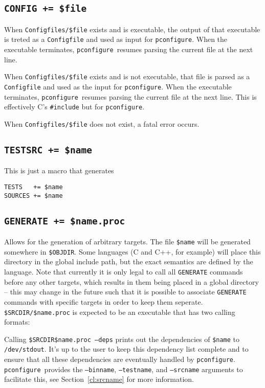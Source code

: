 \documentclass{article}
\newcommand{\pconfigure}{\texttt{pconfigure}}
\begin{document}
\subsection{\texttt{CONFIG += \$file} \label{cmd:config}}

When \texttt{Configfiles/\$file} exists and is executable, the output
of that executable is treted as a \texttt{Configfile} and used as
input for \pconfigure.  When the executable terminates,
\pconfigure\ resumes parsing the current file at the next line.

When \texttt{Configfiles/\$file} exists and is not executable, that
file is parsed as a \texttt{Configfile} and used as the input for
\pconfigure.  When the executable terminates, \pconfigure\ resumes
parsing the current file at the next line.  This is effectively C's
\texttt{\#include} but for \pconfigure.

When \texttt{Configfiles/\$file} does not exist, a fatal error occurs.

\subsection{\texttt{TESTSRC += \$name}}

This is just a macro that generates
\begin{verbatim}
TESTS   += $name
SOURCES += $name
\end{verbatim}

\subsection{\texttt{GENERATE += \$name.proc}}

Allows for the generation of arbitrary targets.  The file
\texttt{\$name} will be generated somewhere in \texttt{\$OBJDIR}.
Some languages (C and C++, for example) will place this directory in
the global include path, but the exact semantics are defined by the
language.  Note that currently it is only legal to call all
\texttt{GENERATE} commands before any other targets, which results in
them being placed in a global directory -- this may change in the
future such that it is possible to associate \texttt{GENERATE}
commands with specific targets in order to keep them seperate.
\texttt{\$SRCDIR/\$name.proc} is expected to be an executable that has
two calling formats:

Calling \texttt{\$SRCDIR\$name.proc --deps} prints out the
dependencies of \texttt{\$name} to \texttt{/dev/stdout}.  It's up to
the user to keep this dependency list complete and to ensure that all
these dependencies are eventually handled by \pconfigure.
\pconfigure\ provides the \texttt{--binname}, \texttt{--testname}, and
\texttt{--srcname} arguments to facilitate this, see
Section~\ref{cl:srcname} for more information.
\end{document}
